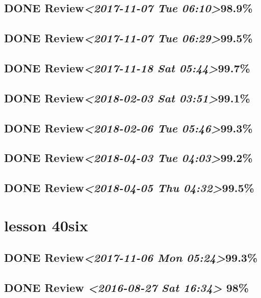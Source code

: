 \documentclass[11pt]{ctexart}
\begin{document}
\subsection{{\bfseries\sffamily DONE} Review\textit{<2017-11-07 Tue 06:10>}98.9\%}
\label{sec:orgec3f29c}
\subsection{{\bfseries\sffamily DONE} Review\textit{<2017-11-07 Tue 06:29>}99.5\%}
\label{sec:orgc6b527b}
\subsection{{\bfseries\sffamily DONE} Review\textit{<2017-11-18 Sat 05:44>}99.7\%}
\label{sec:orgd9c47c5}
\subsection{{\bfseries\sffamily DONE} Review\textit{<2018-02-03 Sat 03:51>}99.1\%}
\label{sec:org004d276}
\subsection{{\bfseries\sffamily DONE} Review\textit{<2018-02-06 Tue 05:46>}99.3\%}
\label{sec:orgf1f65e2}
\subsection{{\bfseries\sffamily DONE} Review\textit{<2018-04-03 Tue 04:03>}99.2\%}
\label{sec:org0d9a945}
\subsection{{\bfseries\sffamily DONE} Review\textit{<2018-04-05 Thu 04:32>}99.5\%}
\label{sec:org2ccfc89}
\section{lesson 40six}
\label{sec:org372a03a}
\subsection{{\bfseries\sffamily DONE} Review\textit{<2017-11-06 Mon 05:24>}99.3\%}
\label{sec:orgddc091e}
\subsection{{\bfseries\sffamily DONE} Review \textit{<2016-08-27 Sat 16:34> } 98\%}
\label{sec:orge985d6a}
\end{document}
